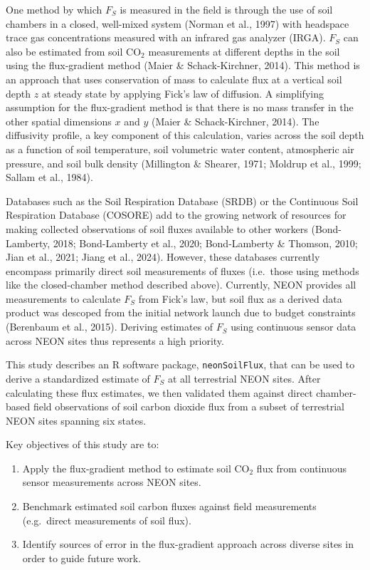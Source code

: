 \documentclass[
  letterpaper,
  DIV=11,
  numbers=noendperiod]{scrartcl}
\providecommand{\tightlist}{%
  \setlength{\itemsep}{0pt}\setlength{\parskip}{0pt}}\usepackage{longtable,booktabs,array}
\begin{document}
One method by which \(F_{S}\) is measured in the field is through the
use of soil chambers in a closed, well-mixed system (Norman et al.,
1997) with headspace trace gas concentrations measured with an infrared
gas analyzer (IRGA). \(F_{S}\) can also be estimated from soil
CO\(_{2}\) measurements at different depths in the soil using the
flux-gradient method (Maier \& Schack-Kirchner, 2014). This method is an
approach that uses conservation of mass to calculate flux at a vertical
soil depth \(z\) at steady state by applying Fick's law of diffusion. A
simplifying assumption for the flux-gradient method is that there is no
mass transfer in the other spatial dimensions \(x\) and \(y\) (Maier \&
Schack-Kirchner, 2014). The diffusivity profile, a key component of this
calculation, varies across the soil depth as a function of soil
temperature, soil volumetric water content, atmospheric air pressure,
and soil bulk density (Millington \& Shearer, 1971; Moldrup et al.,
1999; Sallam et al., 1984).

Databases such as the Soil Respiration Database (SRDB) or the Continuous
Soil Respiration Database (COSORE) add to the growing network of
resources for making collected observations of soil fluxes available to
other workers (Bond-Lamberty, 2018; Bond-Lamberty et al., 2020;
Bond-Lamberty \& Thomson, 2010; Jian et al., 2021; Jiang et al., 2024).
However, these databases currently encompass primarily direct soil
measurements of fluxes (i.e.~those using methods like the closed-chamber
method described above). Currently, NEON provides all measurements to
calculate \(F_{S}\) from Fick's law, but soil flux as a derived data
product was descoped from the initial network launch due to budget
constraints (Berenbaum et al., 2015). Deriving estimates of \(F_{S}\)
using continuous sensor data across NEON sites thus represents a high
priority.

This study describes an R software package, \texttt{neonSoilFlux}, that
can be used to derive a standardized estimate of \(F_{S}\) at all
terrestrial NEON sites. After calculating these flux estimates, we then
validated them against direct chamber-based field observations of soil
carbon dioxide flux from a subset of terrestrial NEON sites spanning six
states.

Key objectives of this study are to:

\begin{enumerate}
\def\labelenumi{\arabic{enumi}.}
\tightlist
\item
  Apply the flux-gradient method to estimate soil CO\(_{2}\) flux from
  continuous sensor measurements across NEON sites.
\item
  Benchmark estimated soil carbon fluxes against field measurements
  (e.g.~direct measurements of soil flux).
\item
  Identify sources of error in the flux-gradient approach across diverse
  sites in order to guide future work.
\end{enumerate}
\end{document}

